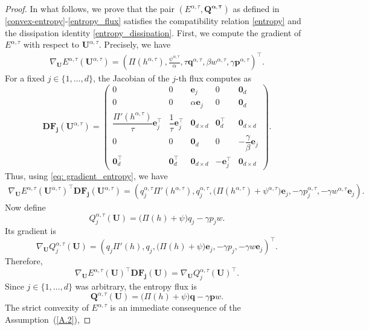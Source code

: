 \documentclass[11pt]{article}
\numberwithin{equation}{section}
\newtheorem{counter example}[theorem]{Counter Example}
\numberwithin{equation}{section}
\numberwithin{equation}{section}
\newcommand{\rel}{^{\alpha, \tau}}
\begin{document}
\begin{proof}
In what follows, we prove that the pair $(E\rel, \mathbf{Q\rel})$ as defined in \eqref{convex-entropy}-\eqref{entropy_flux} satisfies the compatibility relation \eqref{entropy} and the dissipation identity \eqref{entropy_dissipation}. First, we compute the gradient of $E\rel$ with respect to $\mathbf U\rel$. Precisely, we have
\begin{align}\label{eq: gradient_entropy}
\nabla_{\mathbf U}E^{\alpha,\tau}(\mathbf U\rel)
=
\left(
\Pi(h\rel),
\frac{\psi\rel}{\alpha},
\tau\mathbf q\rel,
\beta w\rel,
\gamma\mathbf p\rel
\right)^\top.
\end{align}
For a fixed $j\in\{1,\ldots,d\}$, the Jacobian of the $j$-th flux computes as
\[
 \mathbf{DF_j}(\mathbf U\rel)
=
\begin{pmatrix}
0 & 0 & \mathbf e_j & 0 & \mathbf 0_d\\
0 & 0 & \alpha\mathbf e_j & 0 & \mathbf 0_d\\
\dfrac{\Pi'(h\rel)}{\tau}\mathbf e_j^\top
&
\dfrac{1}{\tau}\mathbf e_j^\top
&
\mathbf{0}_{d\times d}
&
\mathbf 0_d^\top
&
\mathbf{0}_{d\times d}
\\
0 & 0 & \mathbf 0_d & 0
&-\dfrac{\gamma}{\beta}\mathbf e_j\\
\mathbf 0_d^\top & \mathbf 0_d^\top & \mathbf{0}_{d\times d}
&-\mathbf e_j^\top&\mathbf{0}_{d\times d}
\end{pmatrix}.
\]
Thus, using \eqref{eq: gradient_entropy}, we have
\begin{align*}
\nabla_{\mathbf U}E^{\alpha,\tau}(\mathbf U\rel)^\top \mathbf{DF_j}(\mathbf U\rel)=
\left(
q_j\rel\Pi'(h\rel),
q_j\rel,
\bigl(\Pi(h\rel)+\psi\rel\bigr)\mathbf e_j,
-\gamma p_j\rel,
-\gamma w\rel\mathbf e_j
\right).
\end{align*}
Now define
\[
Q_j^{\alpha,\tau}(\mathbf U )
=
\bigl(\Pi(h )+\psi \bigr)q_j 
-\gamma p_j  w .
\]
Its gradient is
\[
\nabla_{\mathbf U}Q_j^{\alpha,\tau}(\mathbf U )
=
\left(
q_j \Pi'(h ),
q_j ,
\bigl(\Pi(h )+\psi \bigr)\mathbf e_j,
-\gamma p_j ,
-\gamma w \mathbf e_j
\right)^\top.
\]
Therefore,
\[
\nabla_{\mathbf U}E^{\alpha,\tau}(\mathbf U )^\top
 \mathbf{DF_j}(\mathbf U )
=
\nabla_{\mathbf U}Q_j^{\alpha,\tau}
(\mathbf U )^\top.
\]
Since $j\in\{1,\ldots,d\}$ was arbitrary, the entropy flux is
\[
\mathbf Q^{\alpha,\tau}(\mathbf U )
=
\bigl(\Pi(h )+\psi \bigr)\mathbf q 
-\gamma\mathbf p  w.
\]
The strict convexity of
$E^{\alpha,\tau}$ is an immediate consequence of the Assumption~(\ref{A.2}),


\end{proof}
\end{document}
